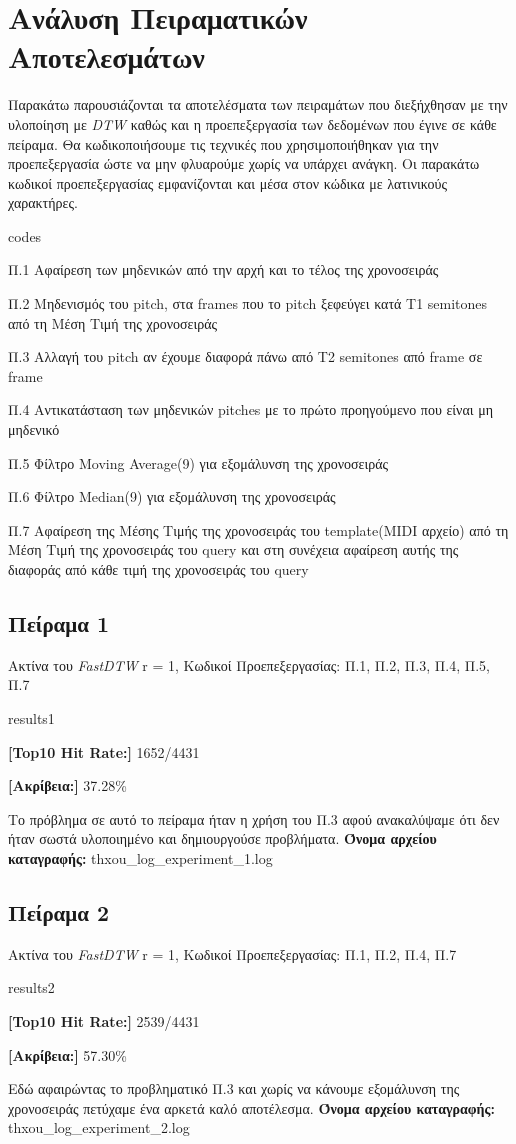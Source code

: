 \section{Ανάλυση Πειραματικών Αποτελεσμάτων}
Παρακάτω παρουσιάζονται τα αποτελέσματα των πειραμάτων που διεξήχθησαν με την υλοποίηση με \textit{DTW} καθώς και η προεπεξεργασία
των δεδομένων που έγινε σε κάθε πείραμα.
Θα κωδικοποιήσουμε τις τεχνικές που χρησιμοποιήθηκαν για την προεπεξεργασία ώστε να μην φλυαρούμε χωρίς
να υπάρχει ανάγκη. Οι παρακάτω κωδικοί προεπεξεργασίας εμφανίζονται και μέσα στον κώδικα με λατινικούς χαρακτήρες.
\begin{labeling}{codes}
  \item[Π.1] Αφαίρεση των μηδενικών από την αρχή και το τέλος της χρονοσειράς
  \item[Π.2] Μηδενισμός του pitch, στα frames που το pitch ξεφεύγει κατά T1 semitones από τη Μέση Τιμή της χρονοσειράς
  \item[Π.3] Αλλαγή του pitch αν έχουμε διαφορά πάνω από Τ2 semitones από frame σε frame
  \item[Π.4] Αντικατάσταση των μηδενικών pitches με το πρώτο προηγούμενο που είναι μη μηδενικό
  \item[Π.5] Φίλτρο Moving Average(9) για εξομάλυνση της χρονοσειράς
  \item[Π.6] Φίλτρο Median(9) για εξομάλυνση της χρονοσειράς
  \item[Π.7] Αφαίρεση της Μέσης Τιμής της χρονοσειράς του template(MIDI αρχείο) από τη Μέση Τιμή της χρονοσειράς του query και στη συνέχεια αφαίρεση αυτής της διαφοράς από κάθε τιμή της χρονοσειράς του query 
\end{labeling}

\subsection{Πείραμα 1}
Ακτίνα του \textit{FastDTW} r = 1, Κωδικοί Προεπεξεργασίας: Π.1, Π.2, Π.3, Π.4, Π.5, Π.7
\begin{labeling}{results1}
  \item \textbf{[Top10 Hit Rate:]} 1652/4431
  \item \textbf{[Ακρίβεια:]} 37.28\%
\end{labeling}
Το πρόβλημα σε αυτό το πείραμα ήταν η χρήση του Π.3 αφού ανακαλύψαμε ότι δεν ήταν σωστά υλοποιημένο και δημιουργούσε προβλήματα.
\textbf{Όνομα αρχείου καταγραφής:} thxou\_log\_experiment\_1.log

\subsection{Πείραμα 2}
Ακτίνα του \textit{FastDTW} r = 1, Κωδικοί Προεπεξεργασίας: Π.1, Π.2, Π.4, Π.7
\begin{labeling}{results2}
  \item \textbf{[Top10 Hit Rate:]} 2539/4431
  \item \textbf{[Ακρίβεια:]} 57.30\%
\end{labeling}
Εδώ αφαιρώντας το προβληματικό Π.3 και χωρίς να κάνουμε εξομάλυνση της χρονοσειράς πετύχαμε ένα αρκετά καλό αποτέλεσμα.
\textbf{Όνομα αρχείου καταγραφής:} thxou\_log\_experiment\_2.log

